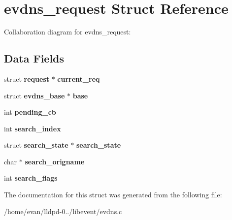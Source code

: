 \section{evdns\-\_\-request \-Struct \-Reference}
\label{structevdns__request}


\-Collaboration diagram for evdns\-\_\-request\-:
\subsection*{\-Data \-Fields}
\begin{DoxyCompactItemize}
\item 
struct {\bf request} $\ast$ {\bfseries current\-\_\-req}\label{structevdns__request_a5e93fe04ab785929fa38aa32d797732b}

\item 
struct {\bf evdns\-\_\-base} $\ast$ {\bfseries base}\label{structevdns__request_a9284dcea4dc075146973bbcd063de32f}

\item 
int {\bfseries pending\-\_\-cb}\label{structevdns__request_a0679100648b4c63979d5779dc659b96c}

\item 
int {\bfseries search\-\_\-index}\label{structevdns__request_a8147d53b2ed3bd2adb872715b2f3280f}

\item 
struct {\bf search\-\_\-state} $\ast$ {\bfseries search\-\_\-state}\label{structevdns__request_af92f29f3fe021105029386a658604999}

\item 
char $\ast$ {\bfseries search\-\_\-origname}\label{structevdns__request_a440d5430d7731e05240f8ce40bcc02ec}

\item 
int {\bfseries search\-\_\-flags}\label{structevdns__request_af36a255c5f4dd41a118ac1b0c1052fd0}

\end{DoxyCompactItemize}


\-The documentation for this struct was generated from the following file\-:\begin{DoxyCompactItemize}
\item 
/home/evan/lldpd-\/0../libevent/evdns.\-c\end{DoxyCompactItemize}
